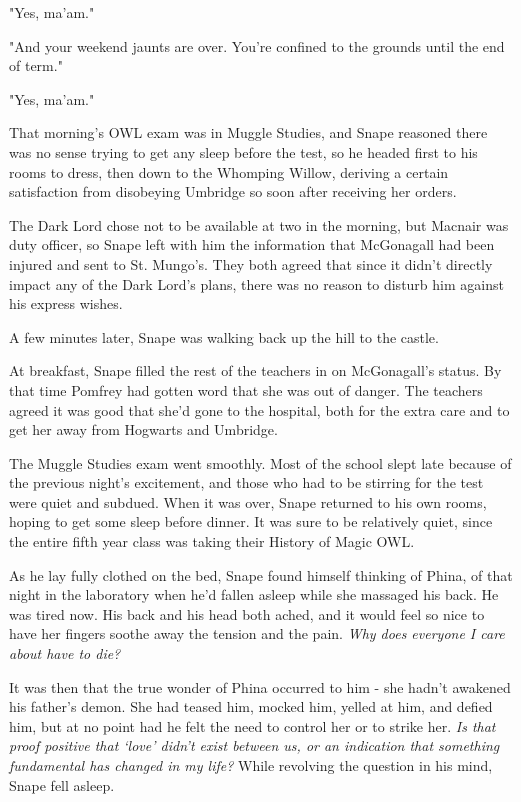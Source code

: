 "Yes, ma'am."

"And your weekend jaunts are over. You're confined to the grounds until the end of term."

"Yes, ma'am."

That morning's OWL exam was in Muggle Studies, and Snape reasoned there was no sense trying to get any sleep before the test, so he headed first to his rooms to dress, then down to the Whomping Willow, deriving a certain satisfaction from disobeying Umbridge so soon after receiving her orders.

The Dark Lord chose not to be available at two in the morning, but Macnair was duty officer, so Snape left with him the information that McGonagall had been injured and sent to St. Mungo's. They both agreed that since it didn't directly impact any of the Dark Lord's plans, there was no reason to disturb him against his express wishes.

A few minutes later, Snape was walking back up the hill to the castle.

At breakfast, Snape filled the rest of the teachers in on McGonagall's status. By that time Pomfrey had gotten word that she was out of danger. The teachers agreed it was good that she'd gone to the hospital, both for the extra care and to get her away from Hogwarts and Umbridge.

The Muggle Studies exam went smoothly. Most of the school slept late because of the previous night's excitement, and those who had to be stirring for the test were quiet and subdued. When it was over, Snape returned to his own rooms, hoping to get some sleep before dinner. It was sure to be relatively quiet, since the entire fifth year class was taking their History of Magic OWL.

As he lay fully clothed on the bed, Snape found himself thinking of Phina, of that night in the laboratory when he'd fallen asleep while she massaged his back. He was tired now. His back and his head both ached, and it would feel so nice to have her fingers soothe away the tension and the pain. \emph{Why does everyone I care about have to die?}

It was then that the true wonder of Phina occurred to him - she hadn't awakened his father's demon. She had teased him, mocked him, yelled at him, and defied him, but at no point had he felt the need to control her or to strike her. \emph{Is that proof positive that `love' didn't exist between us, or an indication that something fundamental has changed in my life?} While revolving the question in his mind, Snape fell asleep.

